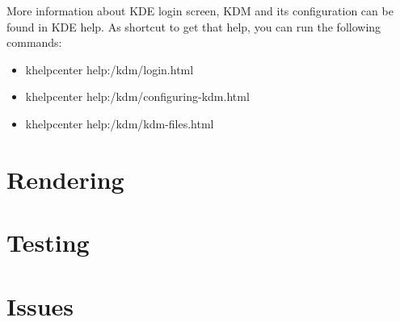 \documentclass{article}
\begin{document}
More information about KDE login screen, KDM and its configuration can
be found in KDE help. As shortcut to get that help, you can run the
following commands:

\begin{itemize}
\item khelpcenter help:/kdm/login.html
\item khelpcenter help:/kdm/configuring-kdm.html
\item khelpcenter help:/kdm/kdm-files.html
\end{itemize}

\section{Rendering}
\section{Testing}
\section{Issues}
\end{document}
